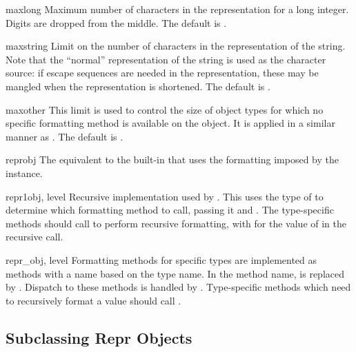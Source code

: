 \begin{memberdesc}{maxlong}
  Maximum number of characters in the representation for a long
  integer.  Digits are dropped from the middle.  The default is
  .
\end{memberdesc}

\begin{memberdesc}{maxstring}
  Limit on the number of characters in the representation of the
  string.  Note that the ``normal'' representation of the string is
  used as the character source: if escape sequences are needed in the
  representation, these may be mangled when the representation is
  shortened.  The default is .
\end{memberdesc}

\begin{memberdesc}{maxother}
  This limit is used to control the size of object types for which no
  specific formatting method is available on the  object.
  It is applied in a similar manner as .  The
  default is .
\end{memberdesc}

\begin{methoddesc}{repr}{obj}
  The equivalent to the built-in  that uses the
  formatting imposed by the instance.
\end{methoddesc}

\begin{methoddesc}{repr1}{obj, level}
  Recursive implementation used by .  This uses the
  type of  to determine which formatting method to call,
  passing it  and .  The type-specific methods
  should call  to perform recursive formatting, with
   for the value of  in the recursive 
  call.
\end{methoddesc}

\begin{methoddescni}{repr_}{obj, level}
  Formatting methods for specific types are implemented as methods
  with a name based on the type name.  In the method name, 
  is replaced by
  .
  Dispatch to these methods is handled by .
  Type-specific methods which need to recursively format a value
  should call .
\end{methoddescni}


\subsection{Subclassing Repr Objects \label{subclassing-reprs}}

